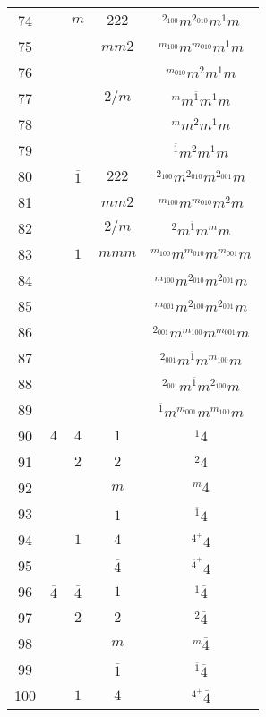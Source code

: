 \begin{longtable}{ccccc}
  74 &  & $m$ & $222$ & ${}^{2_{100}} m {}^{2_{010}} m {}^{1} m $\\
  75 &  &  & $mm2$ & ${}^{m_{100}} m {}^{m_{010}} m {}^{1} m $\\
  76 &  &  &  & ${}^{m_{010}} m {}^{2} m {}^{1} m $\\
  77 &  &  & $2/m$ & ${}^{m} m {}^{\overline{1}} m {}^{1} m $\\
  78 &  &  &  & ${}^{m} m {}^{2} m {}^{1} m $\\
  79 &  &  &  & ${}^{\overline{1}} m {}^{2} m {}^{1} m $\\
  80 &  & $\overline{1}$ & $222$ & ${}^{2_{100}} m {}^{2_{010}} m {}^{2_{001}} m $\\
  81 &  &  & $mm2$ & ${}^{m_{100}} m {}^{m_{010}} m {}^{2} m $\\
  82 &  &  & $2/m$ & ${}^{2} m {}^{\overline{1}} m {}^{m} m $\\
  83 &  & $1$ & $mmm$ & ${}^{m_{100}} m {}^{m_{010}} m {}^{m_{001}} m $\\
  84 &  &  &  & ${}^{m_{100}} m {}^{2_{010}} m {}^{2_{001}} m $\\
  85 &  &  &  & ${}^{m_{001}} m {}^{2_{100}} m {}^{2_{001}} m $\\
  86 &  &  &  & ${}^{2_{001}} m {}^{m_{100}} m {}^{m_{001}} m $\\
  87 &  &  &  & ${}^{2_{001}} m {}^{\overline{1}} m {}^{m_{100}} m $\\
  88 &  &  &  & ${}^{2_{001}} m {}^{\overline{1}} m {}^{2_{100}} m $\\
  89 &  &  &  & ${}^{\overline{1}} m {}^{m_{001}} m {}^{m_{100}} m $\\
  90 & $4$ & $4$ & $1$ & ${}^{1} 4 $\\
  91 &  & $2$ & $2$ & ${}^{2} 4 $\\
  92 &  &  & $m$ & ${}^{m} 4 $\\
  93 &  &  & $\overline{1}$ & ${}^{\overline{1}} 4 $\\
  94 &  & $1$ & $4$ & ${}^{4^{+}} 4 $\\
  95 &  &  & $\overline{4}$ & ${}^{\overline{4}^{+}} 4 $\\
  96 & $\overline{4}$ & $\overline{4}$ & $1$ & ${}^{1} \overline{4} $\\
  97 &  & $2$ & $2$ & ${}^{2} \overline{4} $\\
  98 &  &  & $m$ & ${}^{m} \overline{4} $\\
  99 &  &  & $\overline{1}$ & ${}^{\overline{1}} \overline{4} $\\
  100 &  & $1$ & $4$ & ${}^{4^{+}} \overline{4} $\\

\end{longtable}
